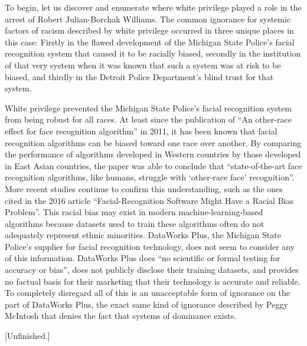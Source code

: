 \documentclass[12pt, letterpaper]{article}
\begin{document}
\begin{mla}
To begin, let us discover and enumerate where white privilege played a role in
the arrest of Robert Julian-Borchak Williams. The common ignorance for
systemic factors of racism described by white privilege occurred in three
unique places in this case: Firstly in the flawed development of the Michigan
State Police's facial recognition system that caused it to be racially biased,
secondly in the institution of that very system when it was known that such a
system was at risk to be biased, and thirdly in the Detroit Police
Department's blind trust for that system.

White privilege prevented the Michigan State Police's facial recognition
system from being robust for all races. At least since the publication of ``An
other-race effect for face recognition algorithm'' in 2011, it has been known
that facial recognition algorithms can be biased toward one race over another.
By comparing the performance of algorithms developed in Western countries by
those developed in East Asian countries, the paper was able to conclude that
``state-of-the-art face recognition algorithms, like humans, struggle with
`other-race face' recognition''. More recent studies continue to confirm this
understanding, such as the ones cited in the 2016 article ``Facial-Recognition
Software Might Have a Racial Bias Problem''. This racial bias may exist in
modern machine-learning-based algorithms because datasets used to train these
algorithms often do not adequately represent ethnic minorities. DataWorks
Plus, the Michigan State Police's supplier for facial recognition technology,
does not seem to consider any of this information. DataWorks Plus does ``no
scientific or formal testing for accuracy or bias'', does not publicly
disclose their training datasets, and provides no factual basis for their
marketing that their technology is accurate and reliable. To completely
disregard all of this is an unacceptable form of ignorance on the part of
DataWorks Plus, the exact same kind of ignorance described by Peggy McIntosh
that denies the fact that systems of dominance exists.

[Unfinished.]



\end{mla}
\end{document}

